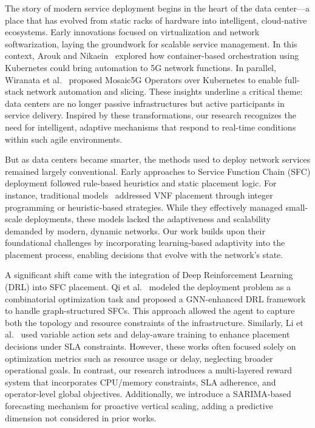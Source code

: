 \documentclass[conference]{IEEEtran}
\begin{document}
	The story of modern service deployment begins in the heart of the data center—a place that has evolved from static racks of hardware into intelligent, cloud-native ecosystems. Early innovations focused on virtualization and network softwarization, laying the groundwork for scalable service management. In this context, Arouk and Nikaein~\cite{arouk2020cloud} explored how container-based orchestration using Kubernetes could bring automation to 5G network functions. In parallel, Wiranata et al.~\cite{wiranata2020automation} proposed Mosaic5G Operators over Kubernetes to enable full-stack network automation and slicing. These insights underline a critical theme: data centers are no longer passive infrastructures but active participants in service delivery. Inspired by these transformations, our research recognizes the need for intelligent, adaptive mechanisms that respond to real-time conditions within such agile environments.
	
	But as data centers became smarter, the methods used to deploy network services remained largely conventional. Early approaches to Service Function Chain (SFC) deployment followed rule-based heuristics and static placement logic. For instance, traditional models~\cite{sfc1,sfc2} addressed VNF placement through integer programming or heuristic-based strategies. While they effectively managed small-scale deployments, these models lacked the adaptiveness and scalability demanded by modern, dynamic networks. Our work builds upon their foundational challenges by incorporating learning-based adaptivity into the placement process, enabling decisions that evolve with the network's state.
	
	A significant shift came with the integration of Deep Reinforcement Learning (DRL) into SFC placement. Qi et al.~\cite{qi2021graph} modeled the deployment problem as a combinatorial optimization task and proposed a GNN-enhanced DRL framework to handle graph-structured SFCs. This approach allowed the agent to capture both the topology and resource constraints of the infrastructure. Similarly, Li et al.~\cite{li2020drl} used variable action sets and delay-aware training to enhance placement decisions under SLA constraints. However, these works often focused solely on optimization metrics such as resource usage or delay, neglecting broader operational goals. In contrast, our research introduces a multi-layered reward system that incorporates CPU/memory constraints, SLA adherence, and operator-level global objectives. Additionally, we introduce a SARIMA-based forecasting mechanism for proactive vertical scaling, adding a predictive dimension not considered in prior works.
	
\end{document}
